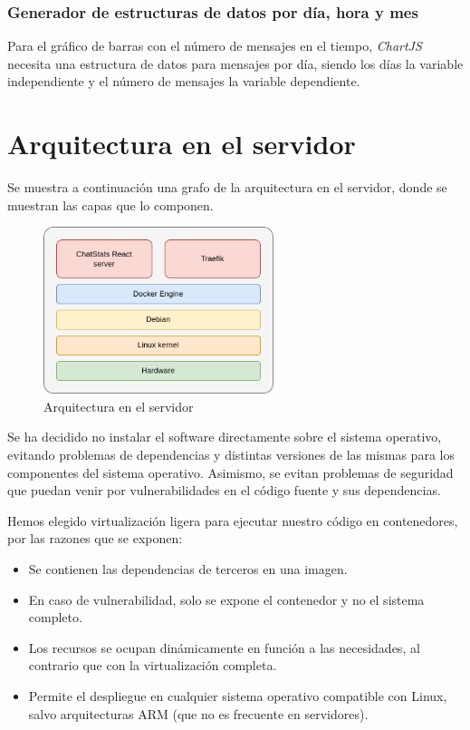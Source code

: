 \subsubsection{Generador de estructuras de datos por día, hora y mes}

Para el gráfico de barras con el número de mensajes en el tiempo, \textit{ChartJS} necesita una estructura de datos para mensajes por día, siendo los días la variable independiente y el número de mensajes la variable dependiente.


\section{Arquitectura en el servidor}

Se muestra a continuación una grafo de la arquitectura en el servidor, donde se muestran las capas que lo componen.

\begin{figure}[H]
	\centering
	\includegraphics[width=0.6\textwidth]{img/server.png}
	\caption{Arquitectura en el servidor}
	\label{fig:chap4:architecture_server}
\end{figure}

Se ha decidido no instalar el software directamente sobre el sistema operativo, evitando problemas de dependencias y distintas versiones de las mismas para los componentes del sistema operativo. Asimismo, se evitan problemas de seguridad que puedan venir por vulnerabilidades en el código fuente y sus dependencias.

Hemos elegido virtualización ligera para ejecutar nuestro código en contenedores, por las razones que se exponen:

\begin{itemize}
	\item Se contienen las dependencias de terceros en una imagen.
	\item En caso de vulnerabilidad, solo se expone el contenedor y no el sistema completo.
	\item Los recursos se ocupan dinámicamente en función a las necesidades, al contrario que con la virtualización completa.
	\item Permite el despliegue en cualquier sistema operativo compatible con Linux, salvo arquitecturas ARM (que no es frecuente en servidores).
\end{itemize}

